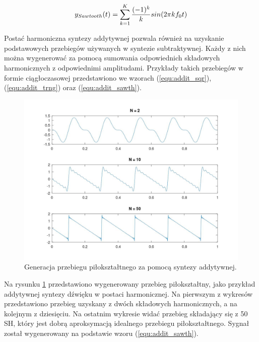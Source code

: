 \begin{equation} \label{equ:addit_sawth}
y_{Sawtooth}(t) = \sum_{k=1}^{K} \frac{(-1)^k}{k} sin(2\pi kf_{0}t) \\
\end{equation}

Postać harmoniczna syntezy addytywnej pozwala również na uzyskanie podstawowych przebiegów używanych w syntezie subtraktywnej. Każdy z nich można wygenerować za pomocą sumowania odpowiednich składowych harmonicznych z odpowiednimi amplitudami. Przykłady takich przebiegów w formie ciągłoczasowej przedstawiono we wzorach (\ref{equ:addit_sqr}), (\ref{equ:addit_trng}) oraz (\ref{equ:addit_sawth}).

\begin{figure}[H]
	\centering
	\includegraphics[width=12cm]{grafiki/add_sawtooth}
	\captionsetup{justification=centering}
	\caption{Generacja przebiegu piłokształtnego za pomocą syntezy addytywnej.}
	\label{rys:add_sawtooth}
\end{figure}

Na rysunku \ref{rys:add_sawtooth} przedstawiono wygenerowany przebieg piłokształtny, jako przykład addytywnej syntezy dźwięku w postaci harmonicznej. Na pierwszym z wykresów przedstawiono przebieg uzyskany z dwóch składowych harmonicznych, a na kolejnym z dziesięciu. Na ostatnim wykresie widać przebieg składający się z 50 SH, który jest dobrą aproksymacją idealnego przebiegu piłokształtnego. Sygnał został wygenerowany na podstawie wzoru (\ref{equ:addit_sawth}).

